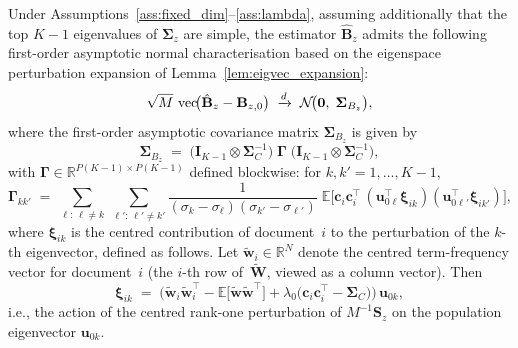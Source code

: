 \begin{theorem}
\label{thm:normality}
Under Assumptions~\ref{ass:fixed_dim}--\ref{ass:lambda}, assuming
additionally that the top $K{-}1$ eigenvalues of
$\boldsymbol{\Sigma}_z$ are simple, the estimator
$\hat{\mathbf{B}}_z$ admits the following first-order asymptotic
normal characterisation based on the eigenspace perturbation expansion
of Lemma~\ref{lem:eigvec_expansion}:
\begin{equation}
  \sqrt{M}\,\operatorname{vec}\!\bigl(\hat{\mathbf{B}}_z - \mathbf{B}_{z,0}\bigr)
  \;\xrightarrow{d}\;
  \mathcal{N}\!\bigl(\mathbf{0},\;\boldsymbol{\Sigma}_{B_z}\bigr),
  \label{eq:Bz_clt}
\end{equation}
where the first-order asymptotic covariance matrix
$\boldsymbol{\Sigma}_{B_z}$ is given by
\begin{equation}
  \boldsymbol{\Sigma}_{B_z}
  \;=\;
  \bigl(\mathbf{I}_{K-1}\otimes\boldsymbol{\Sigma}_C^{-1}\bigr)
  \;\boldsymbol{\Gamma}\;
  \bigl(\mathbf{I}_{K-1}\otimes\boldsymbol{\Sigma}_C^{-1}\bigr),
  \label{eq:Sigma_Bz}
\end{equation}
with $\boldsymbol{\Gamma}\in\mathbb{R}^{P(K-1)\times P(K-1)}$
defined blockwise: for $k,k'=1,\dots,K{-}1$,
\begin{equation}
  \boldsymbol{\Gamma}_{kk'}
  \;=\;
  \sum_{\ell:\,\ell\neq k}\;
  \sum_{\ell':\,\ell'\neq k'}
  \frac{1}{(\sigma_k-\sigma_\ell)(\sigma_{k'}-\sigma_{\ell'})}
  \;\mathbb{E}\!\bigl[
    \mathbf{c}_i\mathbf{c}_i^{\!\top}\,
    (\mathbf{u}_{0\ell}^{\!\top}\boldsymbol{\xi}_{ik})
    (\mathbf{u}_{0\ell'}^{\!\top}\boldsymbol{\xi}_{ik'})
  \bigr],
  \label{eq:Gamma_block}
\end{equation}
where $\boldsymbol{\xi}_{ik}$ is the centred contribution of
document~$i$ to the perturbation of the $k$-th eigenvector, defined as
follows. Let $\widetilde{\mathbf{w}}_i\in\mathbb{R}^N$ denote the
centred term-frequency vector for document~$i$ (the $i$-th row
of~$\widetilde{\mathbf{W}}$, viewed as a column vector). Then
\begin{equation}
  \boldsymbol{\xi}_{ik}
  \;=\;
  \bigl(
    \widetilde{\mathbf{w}}_i\widetilde{\mathbf{w}}_i^{\!\top}
    - \mathbb{E}\bigl[
        \widetilde{\mathbf{w}}\widetilde{\mathbf{w}}^{\!\top}
      \bigr]
    + \lambda_0\bigl(
        \mathbf{c}_i\mathbf{c}_i^{\!\top}
        - \boldsymbol{\Sigma}_C
      \bigr)
  \bigr)\,\mathbf{u}_{0k},
  \label{eq:xi_ik}
\end{equation}
i.e., the action of the centred rank-one perturbation of $M^{-1}\mathbf{S}_z$
on the population eigenvector $\mathbf{u}_{0k}$.
\end{theorem}

